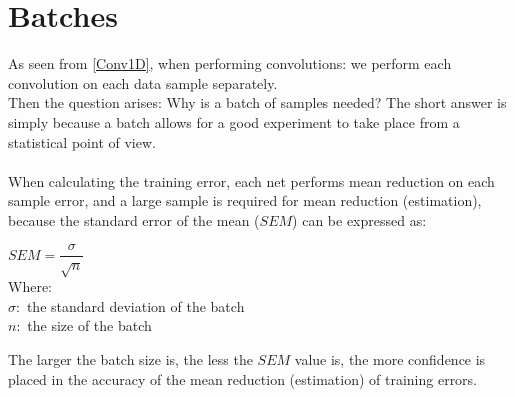 \documentclass[a4paper, 12pt]{report}
\newcommand\tab[1][1cm]{\hspace*{#1}}
\begin{document}
\section{\textbf{Batches}}
As seen from \cref{Conv1D}, when performing convolutions: we perform each convolution on each data sample separately.\\
Then the question arises: Why is a batch of samples needed?
The short answer is simply because a batch allows for a good experiment to take place from a statistical point of view.\\\\
When calculating the training error, each net performs mean reduction on each sample error, and a large sample is required for mean reduction (estimation), because the standard error of the mean ($ SEM $) can be expressed as:\\
\begin{center}
	\begin{minipage}{0.5\textwidth}
	$ SEM = \dfrac{\sigma}{\sqrt{n}} $\\
	Where:\\
	\tab \space \space $ \sigma: $ the standard deviation of the batch \\
	\tab \space \space $ n: $ the size of the batch 
\end{minipage}
\end{center}
The larger the batch size is, the less the $ SEM $ value is, the more confidence is placed in the accuracy of the mean reduction (estimation) of training errors.
\end{document}
